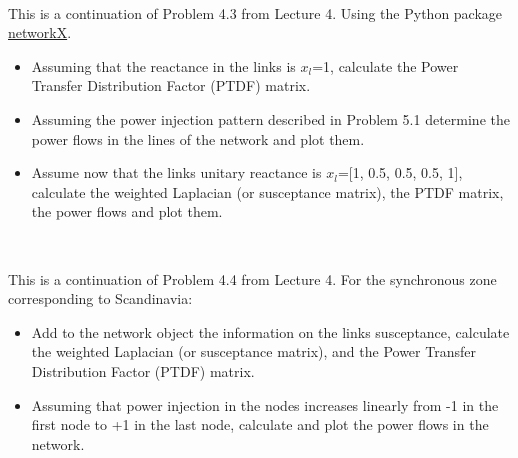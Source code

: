 \documentclass[10pt]{article}
\newenvironment{problem}[2][Problem]{\begin{trivlist}
\item[\hskip \labelsep {\bfseries #1}\hskip \labelsep {\bfseries #2.}]}{\end{trivlist}}
\begin{document}
\


\begin{problem}{5.3}
This is a continuation of Problem 4.3 from Lecture 4.
Using the Python package \href{https://networkx.org/}{networkX}.

\begin{itemize}
\item[a)] Assuming that the reactance in the links is $x_l$=1, calculate the Power Transfer Distribution Factor (PTDF) matrix.

\item[b)] Assuming the power injection pattern described in Problem 5.1 determine the power flows in the lines of the network and plot them.

\item[c)] Assume now that the links unitary reactance is $x_{l}$=[1, 0.5, 0.5, 0.5, 1], calculate the weighted Laplacian (or susceptance matrix),  the PTDF matrix, the power flows and plot them. 

\end{itemize}

\end{problem}

\

\begin{problem}{5.4}
This is a continuation of Problem 4.4 from Lecture 4. For the synchronous zone corresponding to Scandinavia:

\begin{itemize}
\item[a)] Add to the network object the information on the links susceptance, calculate the weighted Laplacian (or susceptance matrix), and the Power Transfer Distribution Factor (PTDF) matrix.

\item[b)] Assuming that power injection in the nodes increases linearly from -1 in the first node to +1 in the last node, calculate and plot the power flows in the network.

\end{itemize}

\end{problem}

\end{document}
